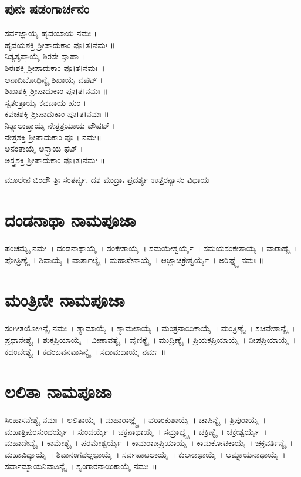 \subsection{ಪುನಃ ಷಡಂಗಾರ್ಚನಂ}
 ಸರ್ವಜ್ಞಾಯೈ ಹೃದಯಾಯ ನಮಃ ।\\ ಹೃದಯಶಕ್ತಿ ಶ್ರೀಪಾದುಕಾಂ ಪೂ।ತ।ನಮಃ ॥\\
 ನಿತ್ಯತೃಪ್ತಾಯೈ ಶಿರಸೇ ಸ್ವಾಹಾ ।\\ ಶಿರಃಶಕ್ತಿ ಶ್ರೀಪಾದುಕಾಂ ಪೂ।ತ।ನಮಃ ॥\\
 ಅನಾದಿಬೋಧಿನ್ಯೈ ಶಿಖಾಯೈ ವಷಟ್ ।\\ ಶಿಖಾಶಕ್ತಿ ಶ್ರೀಪಾದುಕಾಂ ಪೂ।ತ।ನಮಃ ॥\\
 ಸ್ವತಂತ್ರಾಯೈ ಕವಚಾಯ ಹುಂ ।\\ ಕವಚಶಕ್ತಿ ಶ್ರೀಪಾದುಕಾಂ ಪೂ।ತ।ನಮಃ ॥\\
 ನಿತ್ಯಾಲುಪ್ತಾಯೈ ನೇತ್ರತ್ರಯಾಯ ವೌಷಟ್ ।\\ ನೇತ್ರಶಕ್ತಿ ಶ್ರೀಪಾದುಕಾಂ ಪೂ । ನಮಃ॥\\
 ಅನಂತಾಯೈ ಅಸ್ತ್ರಾಯ ಫಟ್ ।\\ ಅಸ್ತ್ರಶಕ್ತಿ ಶ್ರೀಪಾದುಕಾಂ ಪೂ।ತ।ನಮಃ ॥

ಮೂಲೇನ ಬಿಂದೌ ತ್ರಿಃ ಸಂತರ್ಪ್ಯ, ದಶ ಮುದ್ರಾಃ ಪ್ರದರ್ಶ್ಯ ಉತ್ತರನ್ಯಾಸಂ ವಿಧಾಯ
\section{ದಂಡನಾಥಾ ನಾಮಪೂಜಾ}
ಪಂಚಮ್ಯೈ ನಮಃ~।  ದಂಡನಾಥಾಯೈ~।  ಸಂಕೇತಾಯೈ~।  ಸಮಯೇಶ್ವರ್ಯೈ~।  ಸಮಯಸಂಕೇತಾಯೈ~।  ವಾರಾಹ್ಯೈ~।  ಪೋತ್ರಿಣ್ಯೈ~।  ಶಿವಾಯೈ~।  ವಾರ್ತಾಲ್ಯೈ~।  ಮಹಾಸೇನಾಯೈ~।  ಆಜ್ಞಾಚಕ್ರೇಶ್ವರ್ಯೈ~।  ಅರಿಘ್ನ್ಯೈ ನಮಃ ॥
\newpage
\section{ಮಂತ್ರಿಣೀ ನಾಮಪೂಜಾ}
ಸಂಗೀತಯೋಗಿನ್ಯೈ ನಮಃ~।  ಶ್ಯಾಮಾಯೈ~।  ಶ್ಯಾಮಲಾಯೈ~।  ಮಂತ್ರನಾಯಿಕಾಯೈ~।  ಮಂತ್ರಿಣ್ಯೈ~।  ಸಚಿವೇಶಾನ್ಯೈ~।  ಪ್ರಧಾನೇಶ್ಯೈ~।  ಶುಕಪ್ರಿಯಾಯೈ~।  ವೀಣಾವತ್ಯೈ~।  ವೈಣಿಕ್ಯೈ~।  ಮುದ್ರಿಣ್ಯೈ~।  ಪ್ರಿಯಕಪ್ರಿಯಾಯೈ~।  ನೀಪಪ್ರಿಯಾಯೈ~।  ಕದಂಬೇಶ್ಯೈ~।  ಕದಂಬವನವಾಸಿನ್ಯೈ~।  ಸದಾಮದಾಯೈ ನಮಃ~॥
\section{ಲಲಿತಾ ನಾಮಪೂಜಾ}
ಸಿಂಹಾಸನೇಶ್ಯೈ ನಮಃ~।  ಲಲಿತಾಯೈ~।  ಮಹಾರಾಜ್ಞ್ಯೈ~।  ವರಾಂಕುಶಾಯೈ~।  ಚಾಪಿನ್ಯೈ~।  ತ್ರಿಪುರಾಯೈ~।  ಮಹಾತ್ರಿಪುರಸುಂದರ್ಯೈ~।  ಸುಂದರ್ಯೈ~।  ಚಕ್ರನಾಥಾಯೈ~।  ಸಮ್ರಾಜ್ಞ್ಯೈ~।  ಚಕ್ರಿಣ್ಯೈ~।  ಚಕ್ರೇಶ್ವರ್ಯೈ~।  ಮಹಾದೇವ್ಯೈ~।  ಕಾಮೇಶ್ಯೈ~।  ಪರಮೇಶ್ವರ್ಯೈ~।  ಕಾಮರಾಜಪ್ರಿಯಾಯೈ~।  ಕಾಮಕೋಟಿಕಾಯೈ~।  ಚಕ್ರವರ್ತಿನ್ಯೈ~।  ಮಹಾವಿದ್ಯಾಯೈ~।  ಶಿವಾನಂಗವಲ್ಲಭಾಯೈ~।  ಸರ್ವಪಾಟಲಾಯೈ~।  ಕುಲನಾಥಾಯೈ~।  ಆಮ್ನಾಯನಾಥಾಯೈ~।  ಸರ್ವಾಮ್ನಾಯನಿವಾಸಿನ್ಯೈ~।  ಶೃಂಗಾರನಾಯಿಕಾಯೈ ನಮಃ~॥
